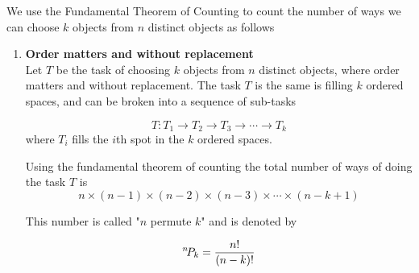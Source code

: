 We use the Fundamental Theorem of Counting to count the number of ways we can choose $k$ objects from $n$ distinct objects as follows\\

\begin{enumerate}
    \item \textbf{Order matters and without replacement}\\
    Let $T$ be the task of choosing $k$ objects from $n$ distinct objects, where order matters and without replacement.  The task $T$ is the same is filling $k$ ordered spaces, and can be broken into a sequence of sub-tasks
    
$$T:T_1\rightarrow T_2\rightarrow T_3 \rightarrow \cdots \rightarrow T_k$$
where $T_i$ fills the $i$th spot in the $k$ ordered spaces. 

Using the fundamental theorem of counting the total number of ways of doing the task $T$ is 
$$n\times (n-1)\times (n-2) \times (n-3) \times \cdots \times (n-k+1)$$

This number is called "$n$ permute $k$" and is denoted by

$${}^{n}\!P_{k}=\frac{n!}{(n-k)!}$$

\end{enumerate}

